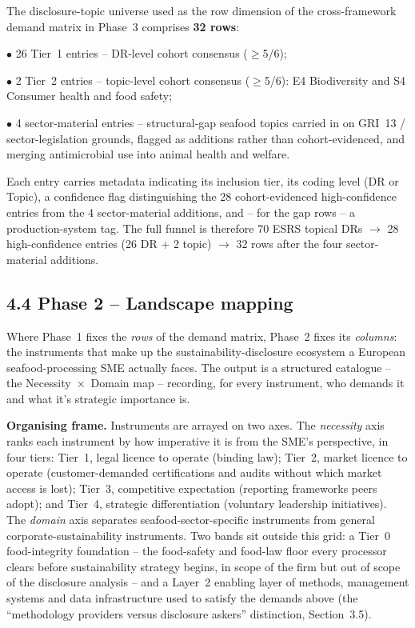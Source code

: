\documentclass[
]{article}
\begin{document}
The disclosure-topic universe used as the row dimension of the
cross-framework demand matrix in Phase~3 comprises \textbf{32 rows}:

$\bullet$ 26 Tier~1 entries -- DR-level cohort consensus ($\geq$5/6);

$\bullet$ 2 Tier~2 entries -- topic-level cohort consensus ($\geq$5/6): E4
Biodiversity and S4 Consumer health and food safety;

$\bullet$ 4 sector-material entries -- structural-gap seafood topics carried
in on GRI~13 / sector-legislation grounds, flagged as additions rather
than cohort-evidenced, and merging antimicrobial use into animal health
and welfare.

Each entry carries metadata indicating its inclusion tier, its coding
level (DR or Topic), a confidence flag distinguishing the 28
cohort-evidenced high-confidence entries from the 4 sector-material
additions, and -- for the gap rows -- a production-system tag. The full
funnel is therefore 70 ESRS topical DRs $\to$ 28 high-confidence entries
(26 DR + 2 topic) $\to$ 32 rows after the four sector-material additions.

\subsection{4.4 Phase 2 -- Landscape
mapping}\label{phase-2---landscape-mapping}

Where Phase~1 fixes the \emph{rows} of the demand matrix, Phase~2 fixes
its \emph{columns}: the instruments that make up the
sustainability-disclosure ecosystem a European seafood-processing SME
actually faces. The output is a structured catalogue -- the
Necessity~$\times$~Domain map -- recording, for every instrument, who demands it and what it's strategic importance is.

\textbf{Organising frame.} Instruments are arrayed on two axes. The
\emph{necessity} axis ranks each instrument by how imperative it is from
the SME's perspective, in four tiers: Tier~1, legal licence to operate
(binding law); Tier~2, market licence to operate (customer-demanded
certifications and audits without which market access is lost); Tier~3,
competitive expectation (reporting frameworks peers adopt); and Tier~4,
strategic differentiation (voluntary leadership initiatives). The
\emph{domain} axis separates seafood-sector-specific instruments from
general corporate-sustainability instruments. Two bands sit outside this
grid: a Tier~0 food-integrity foundation -- the food-safety and food-law
floor every processor clears before sustainability strategy begins, in
scope of the firm but out of scope of the disclosure analysis -- and a
Layer~2 enabling layer of methods, management systems and data
infrastructure used to satisfy the demands above (the
``methodology providers versus disclosure askers'' distinction,
Section~3.5).
\end{document}
